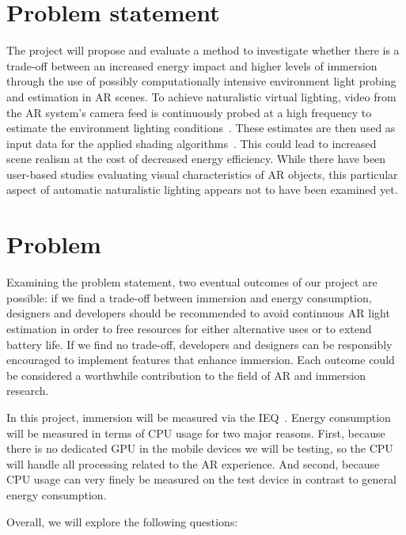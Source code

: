\documentclass[12pt,twoside,english]{article}
\begin{document}
\section{Problem statement}
\label{sect:problem_statement}

The project will propose and evaluate a method to investigate whether there is a trade-off between an increased energy impact and higher levels of immersion through the use of possibly computationally intensive environment light probing and estimation in \gls{AR} scenes.
To achieve naturalistic virtual lighting, video from the \gls{AR} system's camera feed is continuously probed at a high frequency to estimate the environment lighting conditions~\cite{apple_adding_nodate}.
These estimates are then used as input data for the applied shading algorithms~\cite{apple_adding_nodate}.
This could lead to increased scene realism at the cost of decreased energy efficiency.
While there have been user-based studies evaluating visual characteristics of \gls{AR} objects, this particular aspect of automatic naturalistic lighting appears not to have been examined yet.

\section{Problem}
\label{sect:problem}

Examining the problem statement, two eventual outcomes of our project are possible:
if we find a trade-off between immersion and energy consumption, designers and developers should be recommended to avoid continuous \gls{AR} light estimation in order to free resources for either alternative uses or to extend battery life.
If we find no trade-off, developers and designers can be responsibly encouraged to implement features that enhance immersion.
Each outcome could be considered a worthwhile contribution to the field of \gls{AR} and immersion research.

In this project, immersion will be measured via the \gls{IEQ}~\cite{jennett_measuring_2008}.
Energy consumption will be measured in terms of \gls{CPU} usage for two major reasons.
First, because there is no dedicated \gls{GPU} in the mobile devices we will be testing, so the \gls{CPU} will handle all processing related to the \gls{AR} experience.
And second, because CPU usage can very finely be measured on the test device in contrast to general energy consumption.

Overall, we will explore the following questions:
\end{document}
